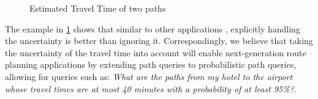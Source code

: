 
\begin{figure}[t]
    \centering
    \vspace{-0.2cm}
    \caption{Estimated Travel Time of two paths}\label{fig:motivation}
    \vspace{-0.5cm}
\end{figure}

The example in \cref{fig:motivation} shows that similar to other applications \cite{Sarma08}, explicitly handling the uncertainty is better than ignoring it. Correspondingly, we believe that taking the uncertainty of the travel time into account will enable next-generation route planning applications by extending path queries to probabilistic path queries, allowing for queries such as:  \textit{What are the paths from my hotel to the airport whose travel times are at most 40 minutes with a probability of at least 95\%?}. 


